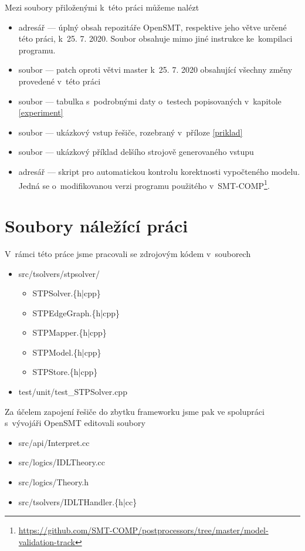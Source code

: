 \documentclass[12pt,a4paper]{report}
\begin{document}
Mezi soubory přiloženými k~této práci můžeme nalézt
\begin{itemize}
	\item adresář  --- úplný obsah repozitáře OpenSMT, respektive jeho větve určené této práci, k~25. 7. 2020. Soubor  obsahuje mimo jiné instrukce ke~kompilaci programu.
	\item soubor  --- patch oproti větvi master k~25. 7. 2020 obsahující všechny změny provedené v~této práci
	\item soubor  --- tabulka s~podrobnými daty o~testech popisovaných v~kapitole \ref{experiment}
	\item soubor  --- ukázkový vstup řešiče, rozebraný v~příloze \ref{priklad}
	\item soubor  --- ukázkový příklad delšího strojově generovaného vstupu
	\item adresář  --- skript pro automatickou kontrolu korektnosti vypočteného modelu. Jedná se o~modifikovanou verzi programu použitého v~SMT-COMP\footnote{\url{https://github.com/SMT-COMP/postprocessors/tree/master/model-validation-track}}.
\end{itemize}

\section{Soubory náležící práci}
V~rámci této práce jsme pracovali se zdrojovým kódem v~souborech
\begin{itemize}
	\tt
	\item src/tsolvers/stpsolver/
	\begin{itemize}
		\item[] STPSolver.\{h|cpp\}
		\item[] STPEdgeGraph.\{h|cpp\}
		\item[] STPMapper.\{h|cpp\}
		\item[] STPModel.\{h|cpp\}
		\item[] STPStore.\{h|cpp\}
	\end{itemize}
	\item test/unit/test\_STPSolver.cpp
\end{itemize}
Za účelem zapojení řešiče do zbytku frameworku jsme pak ve spolupráci s~vývojáři OpenSMT editovali soubory
\begin{itemize}
	\tt
	\item src/api/Interpret.cc
	\item src/logics/IDLTheory.cc
	\item src/logics/Theory.h
	\item src/tsolvers/IDLTHandler.\{h|cc\}
\end{itemize}
\end{document}
